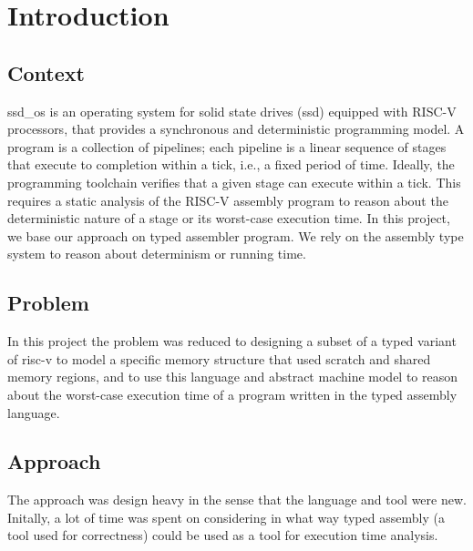 \section{Introduction}

\subsection{Context} %
% 

ssd\_os is an operating system for solid state drives (ssd) equipped with RISC-V
processors, that provides a synchronous and deterministic programming model. A
program is a collection of pipelines; each pipeline is a linear sequence of
stages that execute to completion within a tick, i.e., a fixed period of time.
Ideally, the programming toolchain verifies that a given stage can execute
within a tick. This requires a static analysis of the RISC-V assembly program
to reason about the deterministic nature of a stage or its worst-case execution
time. In this project, we base our approach on typed assembler program. We rely
on the assembly type system to reason about determinism or running time.

\subsection{Problem} %
In this project the problem was reduced to designing a subset of a typed
variant of risc-v to model a specific memory structure that used scratch and
shared memory regions, and to use this language and abstract machine model to
reason about the worst-case execution time of a program written in the typed
assembly language.

\subsection{Approach} %
The approach was design heavy in the sense that the language and tool were new.
Initally, a lot of time was spent on considering in what way typed assembly (a
tool used for correctness) could be used as a tool for execution time analysis.


